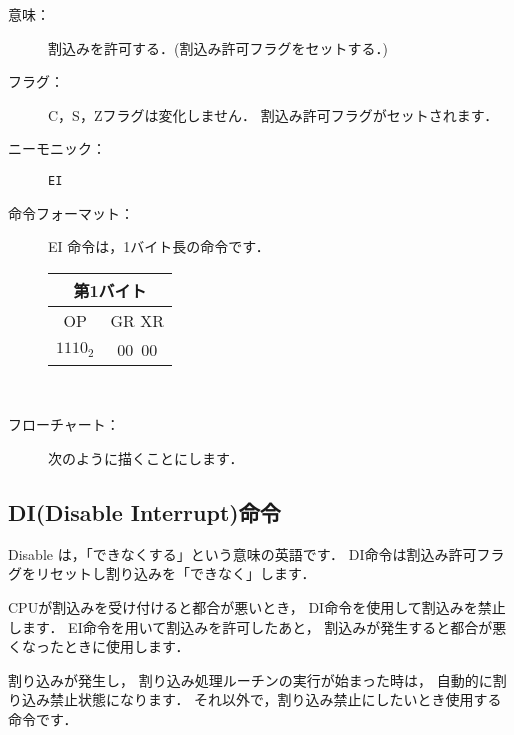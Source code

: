 \begin{description}
\item[意味：]割込みを許可する．(割込み許可フラグをセットする．)

\item[フラグ：]C，S，Zフラグは変化しません．
割込み許可フラグがセットされます．

\item[ニーモニック：] {\tt EI}

\item[命令フォーマット：]EI 命令は，1バイト長の命令です．

\begin{tabular}{|c|c|} \hline
\multicolumn{2}{|c|}{第1バイト} \\
\hline
OP & GR XR \\
\hline
$1110_2$ & $00$~$00$ \\
\hline
\end{tabular}\\

\item[フローチャート：]
次のように描くことにします．

\begin{flushleft}
\epsfxsize=3cm
\end{flushleft}

\end{description}

\subsection{DI(Disable Interrupt)命令}

Disable は，「できなくする」という意味の英語です．
DI命令は割込み許可フラグをリセットし割り込みを「できなく」します．

CPUが割込みを受け付けると都合が悪いとき，
DI命令を使用して割込みを禁止します．
EI命令を用いて割込みを許可したあと，
割込みが発生すると都合が悪くなったときに使用します．

割り込みが発生し，
割り込み処理ルーチンの実行が始まった時は，
自動的に割り込み禁止状態になります．
それ以外で，割り込み禁止にしたいとき使用する命令です．

